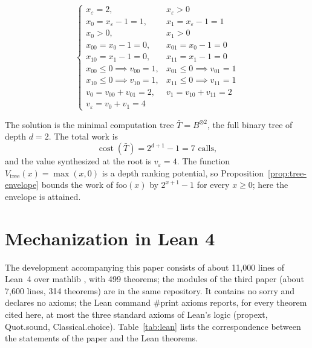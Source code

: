 \documentclass[oneside,english]{amsart}
\numberwithin{equation}{section}
\numberwithin{figure}{section}
\theoremstyle{plain}
\theoremstyle{definition}
\theoremstyle{plain}
\theoremstyle{remark}
\theoremstyle{plain}
\theoremstyle{definition}
\theoremstyle{plain}
\theoremstyle{remark}
\DeclareMathOperator{\cost}{cost}
\newcommand{\lean}[1]{{\ttfamily\small #1}}
\begin{document}
\[
\begin{cases}
x_{\varepsilon} = 2, & x_{\varepsilon} > 0 \\
x_{0} = x_{\varepsilon} - 1 = 1, & x_{1} = x_{\varepsilon} - 1 = 1 \\
x_{0} > 0, & x_{1} > 0 \\
x_{00} = x_{0} - 1 = 0, & x_{01} = x_{0} - 1 = 0 \\
x_{10} = x_{1} - 1 = 0, & x_{11} = x_{1} - 1 = 0 \\
x_{00} \le 0 \implies v_{00} = 1, & x_{01} \le 0 \implies v_{01} = 1 \\
x_{10} \le 0 \implies v_{10} = 1, & x_{11} \le 0 \implies v_{11} = 1 \\
v_{0} = v_{00} + v_{01} = 2, & v_{1} = v_{10} + v_{11} = 2 \\
v_{\varepsilon} = v_{0} + v_{1} = 4
\end{cases}
\]

The solution is the minimal computation tree $\bar{T} = B^{\otimes 2}$, the full binary tree of depth $d = 2$. The total work is
\[
\cost(\bar{T}) = 2^{d+1} - 1 = 7 \text{ calls},
\]
and the value synthesized at the root is $v_{\varepsilon} = 4$. The function $V_{\text{tree}}(x) = \max(x, 0)$ is a depth ranking potential, so Proposition~\ref{prop:tree-envelope} bounds the work of $\text{foo}(x)$ by $2^{x+1} - 1$ for every $x \ge 0$; here the envelope is attained.

\section{Mechanization in Lean 4}
\label{sec:mechanization}

The development accompanying this paper consists of about 11{,}000 lines of Lean~4 \cite{demoura2021lean4} over mathlib \cite{mathlib2020}, with 499 theorems; the modules of the third paper \cite{crosscheckBinary} (about 7{,}600 lines, 314 theorems) are in the same repository. It contains no \lean{sorry} and declares no axioms; the Lean command \lean{\#print axioms} reports, for every theorem cited here, at most the three standard axioms of Lean's logic (\lean{propext}, \lean{Quot.\allowbreak sound}, \lean{Classical.\allowbreak choice}). Table~\ref{tab:lean} lists the correspondence between the statements of the paper and the Lean theorems.
\end{document}
